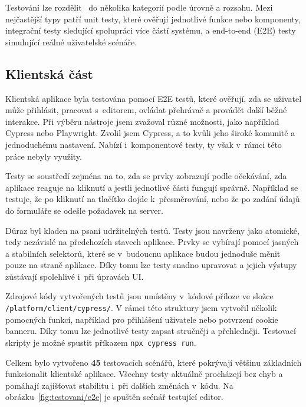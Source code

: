 Testování lze rozdělit~\cite{meszaros_2007} do několika kategorií podle úrovně a rozsahu. 
Mezi nejčastější typy patří unit testy, které ověřují jednotlivé funkce nebo komponenty, integrační testy sledující spolupráci více částí systému, a end-to-end (E2E) testy simulující reálné uživatelské scénáře. 

\subsection{Klientská část}

Klientská aplikace byla testována pomocí E2E testů, které ověřují, zda se uživatel může přihlásit, pracovat s~editorem, ovládat přehrávač a provádět další běžné interakce. 
Při výběru nástroje jsem zvažoval různé možnosti, jako například Cypress nebo Playwright. 
Zvolil jsem Cypress, a to kvůli jeho široké komunitě a jednoduchému nastavení.
Nabízí i~komponentové testy, ty však v~rámci této práce nebyly využity.

Testy se soustředí zejména na to, zda se prvky zobrazují podle očekávání, zda aplikace reaguje na kliknutí a jestli jednotlivé části fungují správně.
Například se testuje, že po kliknutí na tlačítko dojde k~přesměrování, nebo že po zadání údajů do formuláře se odešle požadavek na server.

Důraz byl kladen na psaní udržitelných testů. 
Testy jsou navrženy jako atomické, tedy nezávislé na předchozích stavech aplikace. 
Prvky se vybírají pomocí jasných a stabilních selektorů, které se v~budoucnu aplikace budou jednoduše měnit pouze na straně aplikace.
Díky tomu lze testy snadno upravovat a jejich výstupy zůstávají spolehlivé i~při úpravách UI.


Zdrojové kódy vytvořených testů jsou umístěny v~kódové příloze ve složce \texttt{/platform/client/cypress/}. 
V rámci této struktury jsem vytvořil několik pomocných funkcí, například pro přihlášení uživatele nebo potvrzení cookie banneru. 
Díky tomu lze jednotlivé testy zapsat stručněji a přehledněji.
Testovací skripty je možné spustit příkazem \verb|npx cypress run|.

Celkem bylo vytvořeno \textbf{45} testovacích scénářů, které pokrývají většinu základních funkcionalit klientské aplikace. 
Všechny testy aktuálně procházejí bez chyb a pomáhají zajišťovat stabilitu i~při dalších změnách v~kódu.
Na obrázku~\ref{fig:testovani/e2e} je spuštěn scénář testující editor.


